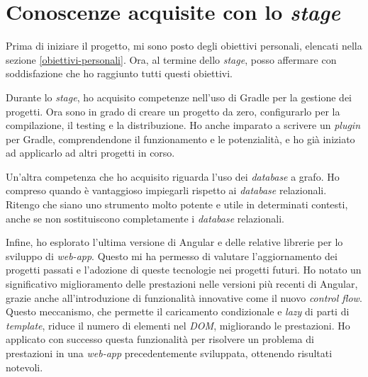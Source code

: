 \section{Conoscenze acquisite con lo \textit{stage}}
Prima di iniziare il progetto, mi sono posto degli obiettivi personali, 
elencati nella sezione \ref{obiettivi-personali}. Ora, al termine dello \textit{stage}, 
posso affermare con soddisfazione che ho raggiunto tutti questi obiettivi.

Durante lo \textit{stage}, ho acquisito competenze nell'uso di Gradle per la gestione dei progetti. 
Ora sono in grado di creare un progetto da zero, configurarlo per la compilazione, il testing e la distribuzione. 
Ho anche imparato a scrivere un \textit{plugin} per Gradle, comprendendone il funzionamento e le potenzialità, 
e ho già iniziato ad applicarlo ad altri progetti in corso.

Un'altra competenza che ho acquisito riguarda l'uso dei \textit{database} a grafo. 
Ho compreso quando è vantaggioso impiegarli rispetto ai \textit{database} relazionali. 
Ritengo che siano uno strumento molto potente e utile in determinati contesti, 
anche se non sostituiscono completamente i \textit{database} relazionali.

Infine, ho esplorato l'ultima versione di Angular e delle relative librerie per lo sviluppo di \textit{web-app}. 
Questo mi ha permesso di valutare l'aggiornamento dei progetti passati e l'adozione di queste tecnologie nei progetti futuri. 
Ho notato un significativo miglioramento delle prestazioni nelle versioni più recenti di Angular, grazie anche all'introduzione 
di funzionalità innovative come il nuovo \textit{control flow}. Questo meccanismo, che permette il caricamento condizionale 
e \textit{lazy} di parti di \textit{template}, riduce il numero di elementi nel \textit{DOM}, migliorando le prestazioni. 
Ho applicato con successo questa funzionalità per risolvere un problema di prestazioni in una \textit{web-app} precedentemente sviluppata, 
ottenendo risultati notevoli.